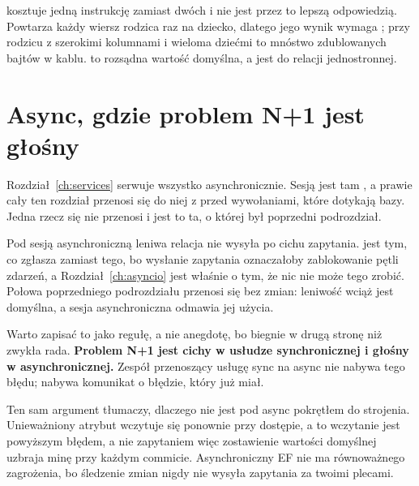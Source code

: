 
\begin{note}
 kosztuje jedną instrukcję zamiast dwóch i nie jest przez
to lepszą odpowiedzią. Powtarza każdy wiersz rodzica raz na dziecko, dlatego
jego wynik wymaga ; przy rodzicu z szerokimi kolumnami i
wieloma dziećmi to mnóstwo zdublowanych bajtów w kablu. 
to rozsądna wartość domyślna, a  jest do relacji
jednostronnej.
\end{note}

\section{Async, gdzie problem N+1 jest głośny}
\label{sec:ch10-async}

Rozdział~\ref{ch:services} serwuje wszystko asynchronicznie. Sesją jest tam
, a prawie cały ten rozdział przenosi się do niej z
 przed wywołaniami, które dotykają bazy. Jedna rzecz się nie
przenosi \dash{} i jest to ta, o której był poprzedni podrozdział.



\noindent
Pod sesją asynchroniczną leniwa relacja nie wysyła po cichu zapytania.
 jest tym, co zgłasza zamiast tego, bo wysłanie
zapytania oznaczałoby zablokowanie pętli zdarzeń, a
Rozdział~\ref{ch:asyncio} jest właśnie o tym, że nic nie może tego zrobić.
Połowa poprzedniego podrozdziału przenosi się bez zmian: leniwość wciąż
jest domyślna, a sesja asynchroniczna odmawia jej użycia.

Warto zapisać to jako regułę, a nie anegdotę, bo biegnie w drugą stronę niż
zwykła rada. \textbf{Problem N+1 jest cichy w usłudze synchronicznej i
głośny w asynchronicznej.} Zespół przenoszący usługę sync na async nie
nabywa tego błędu; nabywa komunikat o błędzie, który już miał.

\begin{csbox}
Ten sam argument tłumaczy, dlaczego  nie jest
pod async pokrętłem do strojenia. Unieważniony atrybut wczytuje się ponownie
przy dostępie, a to wczytanie jest powyższym błędem, a nie zapytaniem \dash{}
więc zostawienie wartości domyślnej uzbraja minę przy każdym commicie.
Asynchroniczny EF nie ma równoważnego zagrożenia, bo śledzenie zmian nigdy
nie wysyła zapytania za twoimi plecami.
\end{csbox}

